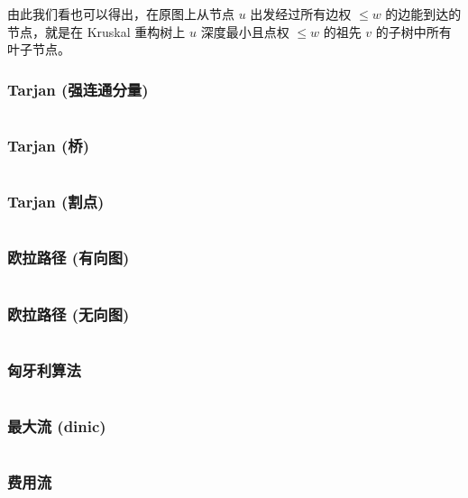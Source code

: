 \documentclass[twoside,twocolumn]{article}
\begin{document}
由此我们看也可以得出，在原图上从节点 $u$ 出发经过所有边权 $\le w$ 的边能到达的节点，就是在 Kruskal 重构树上 $u$ 深度最小且点权 $\le w$ 的祖先 $v$ 的子树中所有叶子节点。

\subsubsection{Tarjan (强连通分量)} %
\inputminted[breaklines, frame=single]{c++}{../algo/图论/tarjan【强连通分量】.cpp}

\subsubsection{Tarjan (桥)} %
\inputminted[breaklines, frame=single]{c++}{../algo/图论/tarjan【桥】.cpp}

\subsubsection{Tarjan (割点)} %
\inputminted[breaklines, frame=single]{c++}{../algo/图论/tarjan【割点】.cpp}

\subsubsection{欧拉路径 (有向图)} %
\inputminted[breaklines, frame=single]{c++}{../algo/图论/欧拉路径【有向图】【不封装】.cpp}


\subsubsection{欧拉路径 (无向图)} %
\inputminted[breaklines, frame=single]{c++}{../algo/图论/欧拉路径【无向图】【不封装】.cpp}


\subsubsection{匈牙利算法} %
\inputminted[breaklines, frame=single]{c++}{../algo/图论/匈牙利算法.cpp}

\subsubsection{最大流 (dinic)} %
\inputminted[breaklines, frame=single]{c++}{../algo/图论/网络流/dinic.cpp}


\subsubsection{费用流} %
\inputminted[breaklines, frame=single]{c++}{../algo/图论/网络流/最小费用最大流.cpp}
\end{document}
